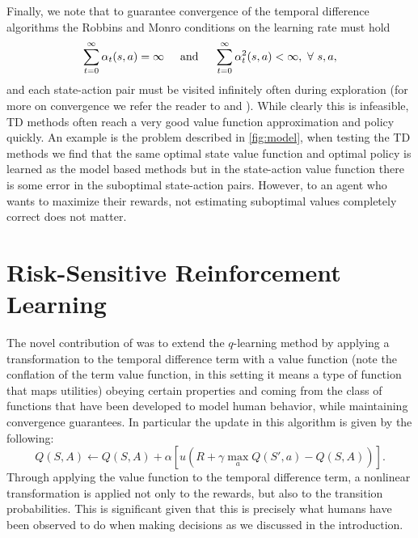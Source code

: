 \documentclass{article}
\begin{document}
Finally, we note that to guarantee convergence of the temporal difference algorithms the Robbins and Monro conditions \cite{robbins1951stochastic} on the learning rate must hold
\begin{equation}
\sum_{t=0}^\infty \alpha_t(s, a) = \infty \hspace{5mm} \text{and} \hspace{5mm} \sum_{t=0}^\infty \alpha_t^2(s, a) < \infty, \ \forall \ s, a,
\end{equation}
and each state-action pair must be visited infinitely often during exploration (for more on convergence we refer the reader to \cite{tsitsiklis1994asynchronous} and \cite{sutton1998reinforcement}). While clearly this is infeasible, TD methods often reach a very good value function approximation and policy quickly. An example is the problem described in \ref{fig:model}, when testing the TD methods we find that the same optimal state value function and optimal policy is learned as the model based methods but in the state-action value function there is some error in the suboptimal state-action pairs. However, to an agent who wants to maximize their rewards, not estimating suboptimal values completely correct does not matter.

 \section{Risk-Sensitive Reinforcement Learning}\label{sec:risk}
The novel contribution of \cite{DBLP:journals/corr/ShenTSO13} was to extend the $q$-learning method by applying a transformation to the temporal difference term with a value function (note the conflation of the term value function, in this setting it means a type of function that maps utilities) obeying certain properties and coming from the class of functions that have been developed to model human behavior, while maintaining convergence guarantees. In particular the update in this algorithm is given by the following:
\begin{equation} 
Q(S, A) \gets Q(S, A) + \alpha[u(R + \gamma \max_a Q(S', a) - Q(S, A))].
\end{equation}
Through applying the value function to the temporal difference term, a nonlinear transformation is applied not only to the rewards, but also to the transition probabilities. This is significant given that this is precisely what humans have been observed to do when making decisions as we discussed in the introduction.
\end{document}
